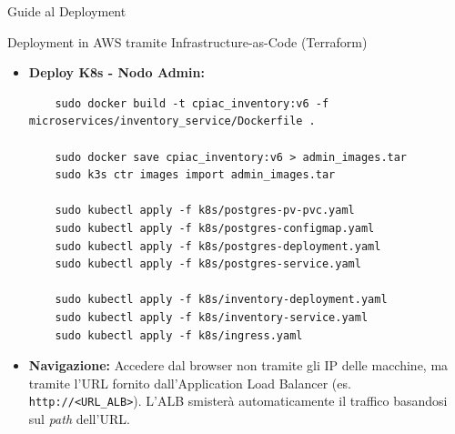 \begin{mychapter}{Guide al Deployment}
\begin{mysection}{Deployment in AWS tramite Infrastructure-as-Code (Terraform)}
\begin{itemize}
\begin{verbatim}
    sudo docker save cpiac_frontend:v6 cpiac_auth:v6 cpiac_order:v6 > clients_images.tar
    sudo k3s ctr images import clients_images.tar

    sudo kubectl apply -f k8s/postgres-pv-pvc.yaml
    sudo kubectl apply -f k8s/postgres-configmap.yaml
    sudo kubectl apply -f k8s/postgres-deployment.yaml
    sudo kubectl apply -f k8s/postgres-service.yaml

    sudo kubectl apply -f k8s/frontend-deployment.yaml
    sudo kubectl apply -f k8s/frontend-service.yaml
    sudo kubectl apply -f k8s/auth-deployment.yaml
    sudo kubectl apply -f k8s/auth-service.yaml
    sudo kubectl apply -f k8s/order-deployment.yaml
    sudo kubectl apply -f k8s/order-service.yaml
    sudo kubectl apply -f k8s/ingress.yaml
    \end{verbatim}
    
    \item \textbf{Deploy K8s - Nodo Admin:}
    \begin{verbatim}
    sudo docker build -t cpiac_inventory:v6 -f microservices/inventory_service/Dockerfile .

    sudo docker save cpiac_inventory:v6 > admin_images.tar
    sudo k3s ctr images import admin_images.tar

    sudo kubectl apply -f k8s/postgres-pv-pvc.yaml
    sudo kubectl apply -f k8s/postgres-configmap.yaml
    sudo kubectl apply -f k8s/postgres-deployment.yaml
    sudo kubectl apply -f k8s/postgres-service.yaml

    sudo kubectl apply -f k8s/inventory-deployment.yaml
    sudo kubectl apply -f k8s/inventory-service.yaml
    sudo kubectl apply -f k8s/ingress.yaml
    \end{verbatim}


    \item \textbf{Navigazione:} Accedere dal browser non tramite gli IP delle macchine, ma tramite l'URL fornito dall'Application Load Balancer (es. \texttt{http://<URL\_ALB>}). L'ALB smisterà automaticamente il traffico basandosi sul \textit{path} dell'URL.
\end{itemize}

\end{mysection}



\end{mychapter}
